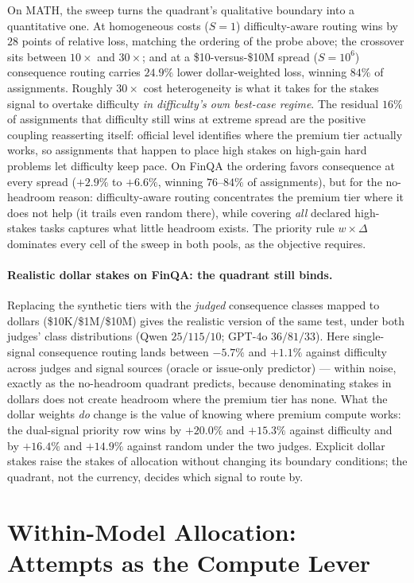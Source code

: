 \documentclass{article}
\begin{document}
On MATH, the sweep turns the quadrant's qualitative boundary into a
quantitative one. At homogeneous costs ($S{=}1$) difficulty-aware
routing wins by $28$ points of relative loss, matching the ordering
of the probe above; the crossover sits between $10\times$ and $30\times$; and at
a \$10-versus-\$10M spread ($S{=}10^{6}$) consequence
routing carries $24.9\%$ lower dollar-weighted loss, winning $84\%$
of assignments. Roughly $30\times$ cost heterogeneity is what it
takes for the stakes signal to overtake difficulty \emph{in
difficulty's own best-case regime}. The residual $16\%$ of
assignments that difficulty still wins at extreme spread are the
positive coupling reasserting itself: official level identifies where
the premium tier actually works, so assignments that happen to place
high stakes on high-gain hard problems let difficulty keep pace. On
FinQA the ordering favors consequence at every spread ($+2.9\%$ to
$+6.6\%$, winning $76$--$84\%$ of assignments), but for the
no-headroom reason: difficulty-aware routing concentrates the
premium tier where it does not help (it trails even random there),
while covering \emph{all} declared high-stakes tasks captures what
little headroom exists. The priority rule $w \times \Delta$
dominates every cell of the sweep in both pools, as the objective
requires.

\paragraph{Realistic dollar stakes on FinQA: the quadrant still
binds.} Replacing the synthetic tiers with the \emph{judged}
consequence classes mapped to dollars
(\$10K/\$1M/\$10M) gives the realistic
version of the same test, under both judges' class distributions
(Qwen $25/115/10$; GPT-4o $36/81/33$). Here single-signal consequence
routing lands between $-5.7\%$ and $+1.1\%$ against difficulty
across judges and signal sources (oracle or issue-only predictor) ---
within noise, exactly as the no-headroom quadrant predicts, because
denominating stakes in dollars does not create headroom where the
premium tier has none. What the dollar weights \emph{do} change is
the value of knowing where premium compute works: the dual-signal
priority row wins by $+20.0\%$ and $+15.3\%$ against difficulty and
by $+16.4\%$ and $+14.9\%$ against random under the two judges. Explicit dollar
stakes raise the stakes of allocation without changing its boundary
conditions; the quadrant, not the currency, decides which signal to
route by.

\section{Within-Model Allocation: Attempts as the Compute Lever}
\label{app:within}
\end{document}
